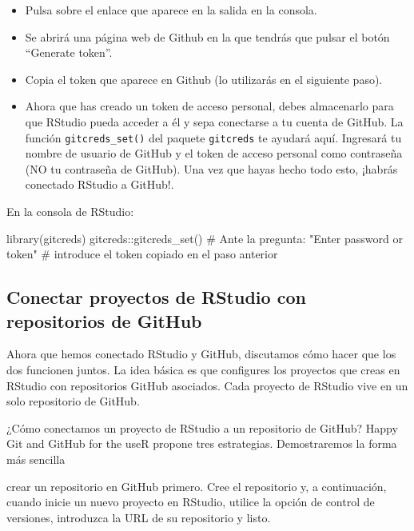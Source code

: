 \documentclass[
  letterpaper,
  DIV=11,
  numbers=noendperiod]{scrreprt}
\newenvironment{Shaded}{\begin{snugshade}}{\end{snugshade}}
\newcommand{\CommentTok}[1]{\textcolor[rgb]{0.37,0.37,0.37}{#1}}
\newcommand{\FunctionTok}[1]{\textcolor[rgb]{0.28,0.35,0.67}{#1}}
\newcommand{\NormalTok}[1]{\textcolor[rgb]{0.00,0.23,0.31}{#1}}
\newcommand{\SpecialCharTok}[1]{\textcolor[rgb]{0.37,0.37,0.37}{#1}}
\begin{document}
\begin{itemize}
\item
  Pulsa sobre el enlace que aparece en la salida en la consola.
\item
  Se abrirá una página web de Github en la que tendrás que pulsar el
  botón ``Generate token''.
\item
  Copia el token que aparece en Github (lo utilizarás en el siguiente
  paso).
\item
  Ahora que has creado un token de acceso personal, debes almacenarlo
  para que RStudio pueda acceder a él y sepa conectarse a tu cuenta de
  GitHub. La función \texttt{gitcreds\_set()} del paquete
  \texttt{gitcreds} te ayudará aquí. Ingresará tu nombre de usuario de
  GitHub y el token de acceso personal como contraseña (NO tu contraseña
  de GitHub). Una vez que hayas hecho todo esto, ¡habrás conectado
  RStudio a GitHub!.
\end{itemize}

En la consola de RStudio:

\begin{Shaded}
\begin{Highlighting}[]
\FunctionTok{library}\NormalTok{(gitcreds)}
\NormalTok{gitcreds}\SpecialCharTok{::}\FunctionTok{gitcreds\_set}\NormalTok{()}
\CommentTok{\# Ante la pregunta: "Enter password or token"}
\CommentTok{\# introduce el token copiado en el paso anterior}
\end{Highlighting}
\end{Shaded}

\subsection{Conectar proyectos de RStudio con repositorios de
GitHub}\label{conectar-proyectos-de-rstudio-con-repositorios-de-github}

Ahora que hemos conectado RStudio y GitHub, discutamos cómo hacer que
los dos funcionen juntos. La idea básica es que configures los proyectos
que creas en RStudio con repositorios GitHub asociados. Cada proyecto de
RStudio vive en un solo repositorio de GitHub.

¿Cómo conectamos un proyecto de RStudio a un repositorio de GitHub?
Happy Git and GitHub for the useR propone tres estrategias.
Demostraremos la forma más sencilla

crear un repositorio en GitHub primero. Cree el repositorio y, a
continuación, cuando inicie un nuevo proyecto en RStudio, utilice la
opción de control de versiones, introduzca la URL de su repositorio y
listo.
\end{document}
